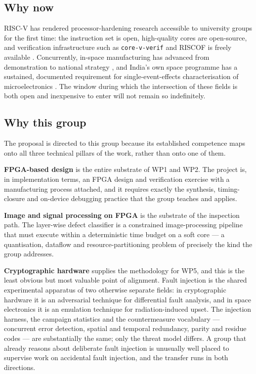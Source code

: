 \documentclass[11pt,a4paper]{article}
\begin{document}
\subsection{Why now}

RISC-V has rendered processor-hardening research accessible to university groups
for the first time: the instruction set is open, high-quality cores are
open-source, and verification infrastructure such as \texttt{core-v-verif} and
RISCOF is freely available \cite{dimascio2021opensource,cva6repo}. Concurrently,
in-space manufacturing has advanced from demonstration to national strategy
\cite{isam_strategy2022,isam_sop2023}, and India's own space programme has a
sustained, documented requirement for single-event-effects characterisation of
microelectronics \cite{iuac_annual2024}. The window during which the
intersection of these fields is both open and inexpensive to enter will not
remain so indefinitely.

\subsection{Why this group}


The proposal is directed to this group because its established competence maps
onto all three technical pillars of the work, rather than onto one of them.

\textbf{FPGA-based design} is the entire substrate of WP1 and WP2. The
project is, in implementation terms, an FPGA design and verification exercise
with a manufacturing process attached, and it requires exactly the synthesis,
timing-closure and on-device debugging practice that the group teaches and
applies.

\textbf{Image and signal processing on FPGA} is the substrate of the inspection
path. The layer-wise defect classifier is a constrained image-processing
pipeline that must execute within a deterministic time budget on a soft core ---
a quantisation, dataflow and resource-partitioning problem of precisely the kind
the group addresses.

\textbf{Cryptographic hardware} supplies the methodology for WP5, and
this is the least obvious but most valuable point of alignment. Fault injection
is the shared experimental apparatus of two otherwise separate fields: in
cryptographic hardware it is an adversarial technique for differential fault
analysis, and in space electronics it is an emulation technique for
radiation-induced upset. The injection harness, the campaign statistics and the
countermeasure vocabulary --- concurrent error detection, spatial and temporal
redundancy, parity and residue codes --- are substantially the same; only the
threat model differs. A group that already reasons about deliberate fault
injection is unusually well placed to supervise work on accidental fault
injection, and the transfer runs in both directions.
\end{document}
